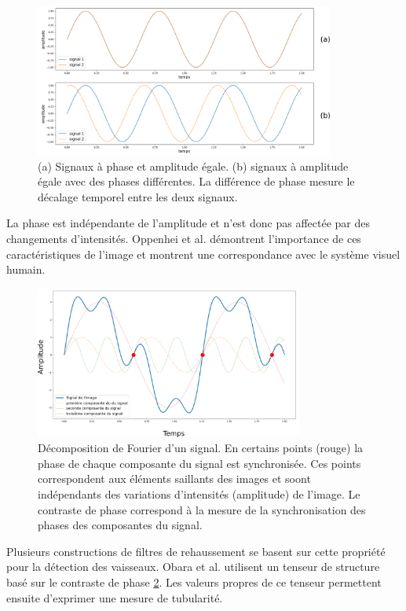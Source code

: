 \begin{figure}[!ht]
  \centering
  \includegraphics[height=5cm]{Images/phase_shift.png}
  \caption{(a) Signaux à phase et amplitude égale. (b) signaux à amplitude égale avec des phases différentes. La différence de phase mesure le décalage temporel entre les deux signaux.}
  \label{fig:phase_shift}
\end{figure}

La phase est indépendante de l'amplitude et n'est donc pas affectée par des changements d'intensités. Oppenhei et al. \cite{Oppenheim1981_phase_importance} démontrent l'importance de ces caractéristiques de l'image et montrent une correspondance avec le système visuel humain. 

\begin{figure}[h]
  \centering
  \includegraphics[height=5cm]{Images/PC_decomposition.png}
  \caption{Décomposition de Fourier d'un signal. En certains points (rouge) la phase de chaque composante du signal est synchronisée. Ces points correspondent aux éléments saillants des images et soont indépendants des variations d'intensités (amplitude) de l'image. Le contraste de phase correspond à la mesure de la synchronisation des phases des composantes du signal.}
  \label{fig:phase_congruency}
\end{figure}

Plusieurs constructions de filtres de rehaussement se basent sur cette propriété pour la détection des vaisseaux. Obara et al. \cite{Obara2012_phase} utilisent un tenseur de structure basé sur le contraste de phase \ref{fig:phase_congruency}. Les valeurs propres de ce tenseur permettent ensuite d'exprimer une mesure de tubularité.


